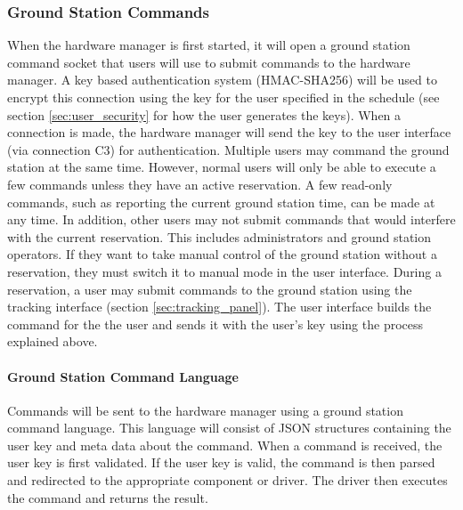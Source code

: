 \documentclass{mxl-design}
\begin{document}
\subsubsection{Ground Station Commands}
\label{sec:connection_c2_commands}
When the hardware manager is first started, it will open a ground station command socket that users will use to submit commands to the hardware manager. A key based authentication system (HMAC-SHA256) will be used to encrypt this connection using the key for the user specified in the schedule (see section \ref{sec:user_security} for how the user generates the keys). When a connection is made, the hardware manager will send the key to the user interface (via connection C3) for authentication. Multiple users may command the ground station at the same time. However, normal users will only be able to execute a few commands unless they have an active reservation. A few read-only commands, such as reporting the current ground station time, can be made at any time. In addition, other users may not submit commands that would interfere with the current reservation. This includes administrators and ground station operators. If they want to take manual control of the ground station without a reservation, they must switch it to manual mode in the user interface. During a reservation, a user may submit commands to the ground station using the tracking interface (section \ref{sec:tracking_panel}). The user interface builds the command for the the user and sends it with the user's key using the process explained above.

\paragraph{Ground Station Command Language}
Commands will be sent to the hardware manager using a ground station command language. This language will consist of JSON structures containing the user key and meta data about the command. When a command is received, the user key is first validated. If the user key is valid, the command is then parsed and redirected to the appropriate component or driver. The driver then executes the command and returns the result.
\end{document}
